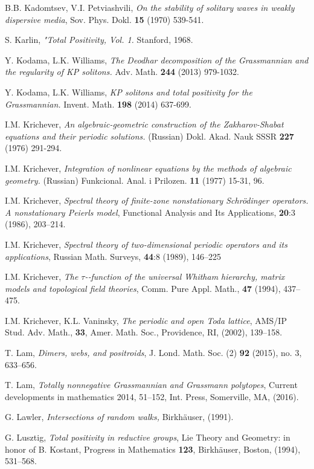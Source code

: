 \documentclass[11pt]{amsart}
\theoremstyle{plain}
\numberwithin{equation}{section}
\begin{document}
\begin{thebibliography}{111}
 B.B. Kadomtsev, V.I. Petviashvili, {\em On the stability of solitary waves in weakly dispersive media}, Sov. Phys. Dokl. {\bf 15} (1970) 539-541.

 S. Karlin, {\em"Total Positivity, Vol. 1.} Stanford, 1968. 

 Y. Kodama, L.K. Williams, {\em The Deodhar decomposition of the Grassmannian and the regularity of KP solitons.} Adv. Math. {\bf 244} (2013) 979-1032.

 Y. Kodama, L.K. Williams, {\em KP solitons and total positivity for the Grassmannian.} Invent. Math. {\bf 198} (2014) 637-699.

 I.M. Krichever, {\em An algebraic-geometric construction of the Zakharov-Shabat equations and their periodic solutions.} (Russian) Dokl. Akad. Nauk SSSR {\bf 227} (1976) 291-294.

 I.M. Krichever, {\em Integration of nonlinear equations by the methods of algebraic geometry.} (Russian) Funkcional. Anal. i Prilozen. {\bf 11} (1977) 15-31, 96. 

I.M. Krichever, {\em Spectral theory of finite-zone nonstationary Schrödinger operators. A nonstationary Peierls model}, Functional Analysis and Its Applications, {\bf 20}:3 (1986), 203--214.

 I.M. Krichever, {\em Spectral theory of two-dimensional periodic operators and its applications}, Russian Math. Surveys, {\bf 44}:8 (1989), 146--225

 I.M. Krichever, {\em The $\tau$-‐function of the universal Whitham hierarchy, matrix models and topological field theories}, Comm. Pure Appl. Math., {\bf 47} (1994), 437--475.

 I.M. Krichever, K.L. Vaninsky, {\em The periodic and open Toda lattice}, AMS/IP Stud. Adv. Math., {\bf 33}, Amer. Math. Soc., Providence, RI, (2002), 139--158. 

 T. Lam, {\em Dimers, webs, and positroids}, J. Lond. Math. Soc. (2) {\bf 92} (2015), no. 3, 633--656.

 T. Lam, {\em Totally nonnegative Grassmannian and Grassmann polytopes}, Current developments in mathematics 2014, 51--152, Int. Press, Somerville, MA, (2016).

 G. Lawler, {\em Intersections of random walks,} Birkh\"auser, (1991).

 G. Lusztig, {\em Total positivity in reductive groups}, Lie Theory and Geometry: in honor
of B. Kostant, Progress in Mathematics {\bf 123}, Birkh\"auser, Boston, (1994), 531--568.


\end{thebibliography}
\end{document}
